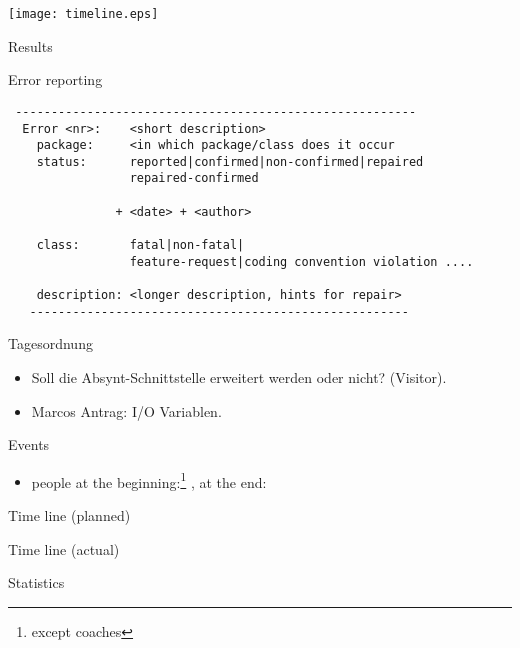 \texttt{[image: timeline.eps]}

\begin{myslide}{Results}
  
\end{myslide}


\begin{myslide}{Error reporting}
{\footnotesize 

\begin{verbatim}
 --------------------------------------------------------
  Error <nr>:    <short description>
    package:     <in which package/class does it occur
    status:      reported|confirmed|non-confirmed|repaired
                 repaired-confirmed

               + <date> + <author>
   
    class:       fatal|non-fatal|
                 feature-request|coding convention violation ....

    description: <longer description, hints for repair>
   -----------------------------------------------------

\end{verbatim}
}
\end{myslide}
\begin{myslide}{Tagesordnung}
  \begin{itemize}
  \item Soll die Absynt-Schnittstelle erweitert werden oder nicht?
    (Visitor).
  \item Marcos Antrag: I/O Variablen.
  \end{itemize}
  
\end{myslide}

\begin{myslide}{Events}
  \begin{itemize}
  \item people at the beginning:\footnote{except coaches} ,
    at the end: 
  \end{itemize}
\end{myslide}

\begin{myslide}{Time line (planned)}

\end{myslide}
\begin{myslide}{Time line  (actual)}
  
\end{myslide}

\begin{myslide}{Statistics}
  
\end{myslide}





